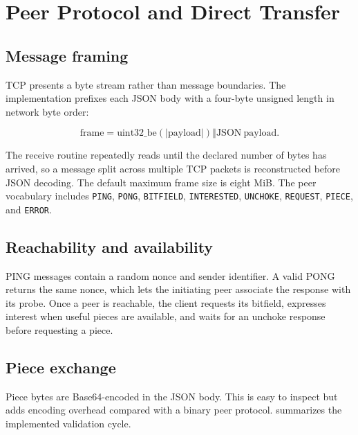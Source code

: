 \section{Peer Protocol and Direct Transfer}
\label{sec:peer-protocol}

\subsection{Message framing}

TCP presents a byte stream rather than message boundaries. The implementation prefixes each JSON body with a four-byte unsigned length in network byte order:

\begin{equation}
  \mathrm{frame} =
  \mathrm{uint32\_be}(\lvert\mathrm{payload}\rvert)
  \mathbin{\Vert} \mathrm{JSON\ payload}.
  \label{eq:frame}
\end{equation}

The receive routine repeatedly reads until the declared number of bytes has arrived, so a message split across multiple TCP packets is reconstructed before JSON decoding. The default maximum frame size is eight MiB. The peer vocabulary includes \texttt{PING}, \texttt{PONG}, \texttt{BITFIELD}, \texttt{INTERESTED}, \texttt{UNCHOKE}, \texttt{REQUEST}, \texttt{PIECE}, and \texttt{ERROR}.

\subsection{Reachability and availability}

PING messages contain a random nonce and sender identifier. A valid PONG returns the same nonce, which lets the initiating peer associate the response with its probe. Once a peer is reachable, the client requests its bitfield, expresses interest when useful pieces are available, and waits for an unchoke response before requesting a piece.

\subsection{Piece exchange}

Piece bytes are Base64-encoded in the JSON body. This is easy to inspect but adds encoding overhead compared with a binary peer protocol.  summarizes the implemented validation cycle.

